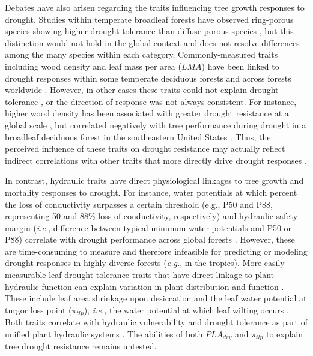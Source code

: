\documentclass[
]{article}
\begin{document}
Debates have also arisen regarding the traits influencing tree growth
responses to drought. Studies within temperate broadleaf forests have
observed ring-porous species showing higher drought tolerance than
diffuse-porous species
\citep{friedrichs_species-specific_2009, elliott_forest_2015, kannenberg_linking_2019},
but this distinction would not hold in the global context
\citep{wheeler_variations_2007, olson_xylem_2020} and does not resolve
differences among the many species within each category.
Commonly-measured traits including wood density and leaf mass per area
(\(LMA\)) have been linked to drought responses within some temperate
deciduous forests
\citep{abrams_adaptations_1990, guerfel_impacts_2009, hoffmann_hydraulic_2011, martinbenito_convergence_2015}
and across forests worldwide \citep{greenwood_tree_2017}. However, in
other cases these traits could not explain drought tolerance
\citep[e.g., in a tropical rainforest;][]{marechaux_leaf_2019}, or the
direction of response was not always consistent. For instance, higher
wood density has been associated with greater drought resistance at a
global scale \citep{greenwood_tree_2017}, but correlated negatively with
tree performance during drought in a broadleaf deciduous forest in the
southeastern United States \citep{hoffmann_hydraulic_2011}. Thus, the
perceived influence of these traits on drought resistance may actually
reflect indirect correlations with other traits that more directly drive
drought responses \citep{hoffmann_hydraulic_2011}.

In contrast, hydraulic traits have direct physiological linkages to tree
growth and mortality responses to drought. For instance, water
potentials at which percent the loss of conductivity surpasses a certain
threshold (e.g., P50 and P88, representing 50 and 88\% loss of
conductivity, respectively) and hydraulic safety margin (\emph{i.e.},
difference between typical minimum water potentials and P50 or P88)
correlate with drought performance across global forests
\citep{anderegg_meta-analysis_2016}. However, these are time-consuming
to measure and therefore infeasible for predicting or modeling drought
responses in highly diverse forests (\emph{e.g.}, in the tropics). More
easily-measurable leaf drought tolerance traits that have direct linkage
to plant hydraulic function can explain variation in plant distribution
and function \citep{medeiros_extensive_2019}. These include leaf area
shrinkage upon desiccation \citep[\(PLA_{dry}\);][]{scoffoni_leaf_2014}
and the leaf water potential at turgor loss point (\(\pi_{tlp}\)),
\emph{i.e.,} the water potential at which leaf wilting occurs
\citep{bartlett_correlations_2016, zhu_leaf_2018}. Both traits correlate
with hydraulic vulnerability and drought tolerance as part of unified
plant hydraulic systems
\citep{scoffoni_leaf_2014, bartlett_correlations_2016, zhu_leaf_2018, farrell_does_2017}.
The abilities of both \(PLA_{dry}\) and \(\pi_{tlp}\) to explain tree
drought resistance remains untested.
\end{document}
